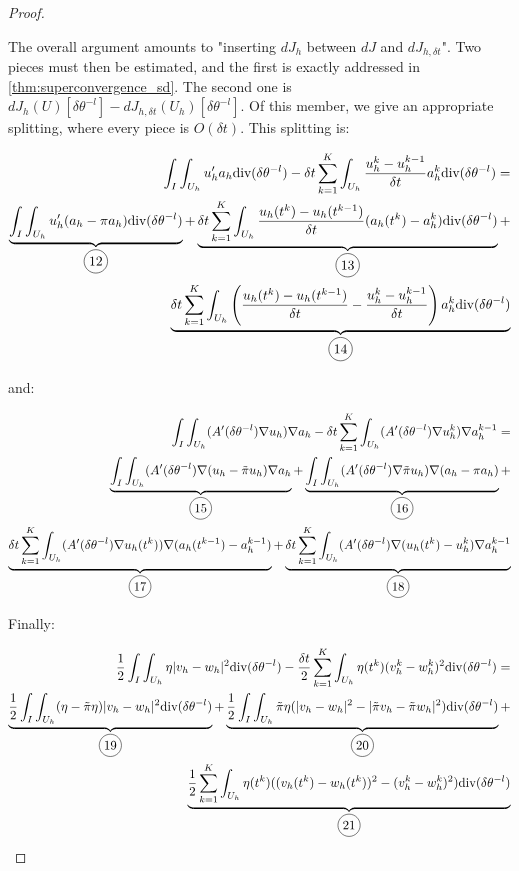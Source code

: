 \documentclass[english,a4paper,9pt,oneside]{scrbook}	%
\theoremstyle{break}
\newenvironment{mproof}[1][\proofname]{%
  \begin{proof}[#1]$ $\par\nobreak\ignorespaces
}{%
  \end{proof}
}
\renewcommand*{\proofname}{Proof}
\theoremstyle{remark}
\newcommand{\ds}{\displaystyle}
\newcommand{\te}{\theta}
\newcommand{\dive}{\text{div}}
\newcommand*\circled[1]{\tikz[baseline=(char.base)]{
            \node[shape=circle,draw,inner sep=2pt] (char) {#1};}}
\begin{document}
\begin{mproof}
The overall argument amounts to "inserting $dJ_h$ between $dJ$ and $dJ_{h,\delta t}$". Two pieces must then be estimated, and the first is exactly addressed in \cref{thm:superconvergence_sd}.
The second one is $\ds dJ_h(U)[\delta \te^{-l}] - dJ_{h,\delta t}(U_h)[\delta \te^{-l}]$. Of this member, we give an appropriate splitting, where every piece is $O(\delta t)$. This splitting is:

\begin{align*}
	\int_I\int_{U_h}u_h'a_h\dive(\delta \te^{-l})-\delta t \sum_{k=1}^K \int_{U_h} \frac{u_h^k-u_h^{k-1}}{\delta t}a_h^k \dive(\delta \te^{-l})  =\\
	\underbrace{\int_I\int_{U_h}u_h'(a_h-\pi a_h)\dive(\delta \te^{-l})}_{\circled{12}}+
	\underbrace{\delta t \sum_{k=1}^K\int_{U_h}\frac{u_h(t^k)-u_h(t^{k-1})}{\delta t}(a_h(t^k)-a_h^k)\dive(\delta \te^{-l})}_{\circled{13}}+\\
	\underbrace{\delta t \sum_{k=1}^K \int_{U_h} \left (\frac{u_h(t^k)-u_h(t^{k-1})}{\delta t}-\frac{u_h^k-u_h^{k-1}}{\delta t}\right )a_h^k \dive(\delta \te^{-l})}_{\circled{14}}
\end{align*}

and:

\begin{align*}
	\int_I \int_{U_h} (A'(\delta \te^{-l})\nabla u_h)\nabla a_h - \delta t \sum_{k=1}^K \int_{U_h} (A'(\delta \te^{-l})\nabla u_h^k)\nabla a_h^{k-1} =  \\
	\underbrace{\int_I \int_{U_h} (A'(\delta \te^{-l})\nabla (u_h-\tilde{\pi} u_h)\nabla a_h }_{\circled{15}}+ 
	\underbrace{\int_I \int_{U_h} (A'(\delta \te^{-l})\nabla \tilde{\pi} u_h ) \nabla (a_h - \pi a_h)}_{\circled{16}} +\\
	\underbrace{\delta t \sum_{k=1}^K \int_{U_h} (A'(\delta \te^{-l})\nabla u_h(t^k) ) \nabla( a_h(t^{k-1})-a_h^{k-1})}_{\circled{17}} +
	\underbrace{\delta t \sum_{k=1}^K \int_{U_h} (A'(\delta \te^{-l})\nabla (u_h(t^k)-u_h^k ) \nabla a_h^{k-1}}_{\circled{18}}
\end{align*}

Finally:

\begin{align*}
	\frac{1}{2} \int_I \int_{U_h} \eta |v_h-w_h|^2\dive(\delta \te^{-l}) - \frac{\delta t}{2} \sum_{k=1}^K \int_{U_h}\eta(t^k)(v_h^k-w_h^k)^2\dive(\delta \te^{-l}) = \\
	\underbrace{\frac{1}{2} \int_I \int_{U_h} (\eta-\tilde{\pi}\eta) |v_h-w_h|^2\dive(\delta \te^{-l})}_{\circled{19}}+
	\underbrace{\frac{1}{2} \int_I \int_{U_h} \tilde{\pi} \eta (|v_h-w_h|^2 - |\tilde{\pi} v_h-\tilde{\pi}w_h|^2)\dive(\delta \te^{-l})}_{\circled{20}}+\\
	\underbrace{\frac{1}{2} \sum_{k=1}^K \int_{U_h}\eta(t^k)((v_h(t^k)-w_h(t^k))^2-(v_h^k-w_h^k)^2)\dive(\delta \te^{-l})}_{\circled{21}}
\end{align*}


\end{mproof}
\end{document}

